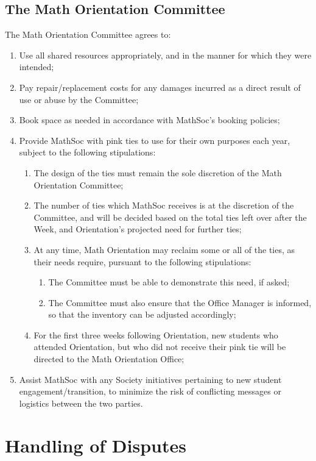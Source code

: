 \documentclass[12pt, letterpaper]{article}
\begin{document}
\subsection{The Math Orientation Committee}
The Math Orientation Committee agrees to:
\begin{enumerate}
    \item Use all shared resources appropriately, and in the manner for which they were intended;
    \item Pay repair/replacement costs for any damages incurred as a direct result of use or abuse by the Committee;
    \item Book space as needed in accordance with MathSoc’s booking policies;
    \item Provide MathSoc with pink ties to use for their own purposes each year, subject to the following stipulations:
\begin{enumerate}
    \item The design of the ties must remain the sole discretion of the Math Orientation Committee;
    \item The number of ties which MathSoc receives is at the discretion of the Committee, and will be decided based on the total ties left over after the Week, and Orientation’s projected need for further ties;
    \item At any time, Math Orientation may reclaim some or all of the ties, as their needs require, pursuant to the following stipulations: 
\begin{enumerate}
    \item The Committee must be able to demonstrate this need, if asked;
    \item The Committee must also ensure that the Office Manager is informed, so that the inventory can be adjusted accordingly;
\end{enumerate}
\item For the first three weeks following Orientation, new students who attended Orientation, but who did not receive their pink tie will be directed to the Math Orientation Office;
\end{enumerate}
\item Assist MathSoc with any Society initiatives pertaining to new student 
    engagement/transition, to minimize the risk of conflicting messages or 
    logistics between the two parties.
\end{enumerate}

\section{Handling of Disputes}
\end{document}
